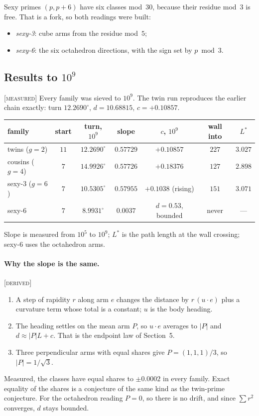 \documentclass[11pt]{article}
\theoremstyle{definition}
\theoremstyle{remark}
\newcommand{\grade}[1]{\textsc{[#1]}}
\begin{document}
Sexy primes $(p,p+6)$ have six classes mod~$30$, because their residue mod~$3$ is free. That is a fork, so both readings were built:
\begin{itemize}
\item \emph{sexy-3}: cube arms from the residue mod~$5$;
\item \emph{sexy-6}: the six octahedron directions, with the sign set by $p\bmod3$.
\end{itemize}

\subsection{Results to $10^9$} \grade{measured}
Every family was sieved to $10^9$. The twin run reproduces the earlier chain exactly: turn $12.2690^\circ$, $d=10.68815$, $c=+0.10857$.
\begin{center}\small\begin{tabular}{lcccccc}
\toprule
family & start & turn, $10^9$ & slope & $c$, $10^9$ & wall into & $L^*$\\
\midrule
twins ($g=2$) & $11$ & $12.2690^\circ$ & $0.57729$ & $+0.10857$ & $227$ & $3.027$\\
cousins ($g=4$) & $7$ & $14.9926^\circ$ & $0.57726$ & $+0.18376$ & $127$ & $2.898$\\
sexy-3 ($g=6$) & $7$ & $10.5305^\circ$ & $0.57955$ & $+0.1038$ (rising) & $151$ & $3.071$\\
sexy-6 & $7$ & $8.9931^\circ$ & $0.0037$ & $d=0.53$, bounded & never & ---\\
\bottomrule
\end{tabular}\end{center}
Slope is measured from $10^5$ to $10^9$; $L^*$ is the path length at the wall crossing; sexy-6 uses the octahedron arms.

\paragraph{Why the slope is the same.} \grade{derived}
\begin{enumerate}
\item A step of rapidity $r$ along arm $e$ changes the distance by $r\,(u\cdot e)$ plus a curvature term whose total is a constant; $u$ is the body heading.
\item The heading settles on the mean arm $P$, so $u\cdot e$ averages to $|P|$ and $d\approx|P|L+c$. That is the endpoint law of Section~5.
\item Three perpendicular arms with equal shares give $P=(1,1,1)/3$, so $|P|=1/\sqrt3$.
\end{enumerate}
Measured, the classes have equal shares to $\pm0.0002$ in every family. Exact equality of the shares is a conjecture of the same kind as the twin-prime conjecture. For the octahedron reading $P=0$, so there is no drift, and since $\sum r^2$ converges, $d$ stays bounded.
\end{document}
